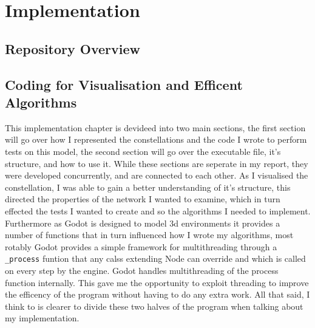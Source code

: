 \documentclass[12pt]{article}
\begin{document}
\section{Implementation}

\subsection{Repository Overview}

\subsection{Coding for Visualisation and Efficent Algorithms}

This implementation chapter is devideed into two main sections, the first section will go over how I represented the constellations and the code I wrote to perform tests on this model, the second section will go over the executable file, it's structure, and how to use it. While these sections are seperate in my report, they were developed concurrently, and are connected to each other.  As I visualised the constellation, I was able to gain a better understanding of it's structure, this directed the properties of the network I wanted to examine, which in turn effected the tests I wanted to create and so the algorithms I needed to implement. Furthermore as Godot is designed to model 3d environments it provides a number of functions that in turn influenced how I wrote my algorithms, most rotably Godot provides a simple framework for multithreading through a \lstinline{_process} funtion that any calss extending Node can override and which is called on every step by the engine. Godot handles multithreading of the process function internally. This gave me the opportunity to exploit threading to improve the efficency of the program without having to do any extra work. All that said, I think to is clearer to divide these two halves of the program when talking about my implementation.
\end{document}
